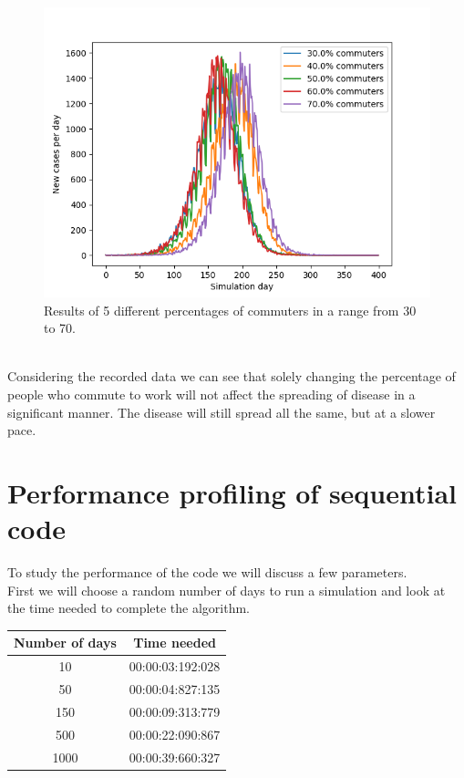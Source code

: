 \documentclass[runningheads]{llncs}
\begin{document}
\begin{figure}
	\includegraphics[width=\textwidth]{test_30-70.png}
	\caption{Results of 5 different percentages of commuters in a range from 30 to 70.}
\end{figure}
\\
Considering the recorded data we can see that solely changing the percentage of people who commute to work will not affect the spreading of disease in a significant manner. The disease will still spread all the same, but at a slower pace. 
\newpage
\section{Performance profiling of sequential code}
To study the performance of the code we will discuss a few parameters.
\\
First we will choose a random number of days to run a simulation and look at the time needed to complete the algorithm.

\begin{center}
	\begin{tabular}{ | c | c |}
	\hline
	Number of days & Time needed \\ \hline
	10 & 00:00:03:192:028 \\ \hline
	50 & 00:00:04:827:135 \\ \hline
	150 & 00:00:09:313:779 \\ \hline
	500 & 00:00:22:090:867 \\ \hline
	1000 & 00:00:39:660:327 \\
	\hline	
	\end{tabular}
\end{center}
\end{document}
